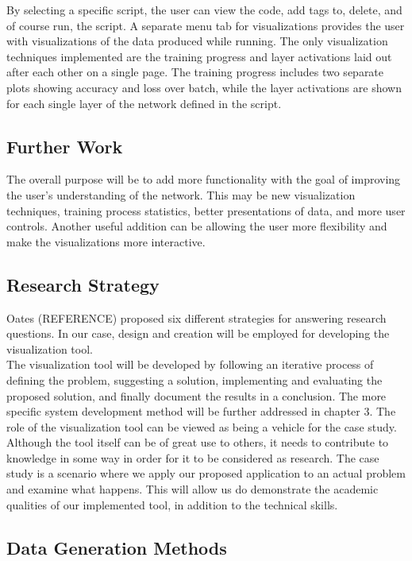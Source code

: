 \noindent By selecting a specific script, the user can view the code, add tags to, delete, and of course run, the script. A separate menu tab for visualizations provides the user with visualizations of the data produced while running. The only visualization techniques implemented are the training progress and layer activations laid out after each other on a single page. The training progress includes two separate plots showing accuracy and loss over batch, while the layer activations are shown for each single layer of the network defined in the script.

\subsection{Further Work}

The overall purpose will be to add more functionality with the goal of improving the user's understanding of the network. This may be new visualization techniques, training process statistics, better presentations of data, and more user controls. Another useful addition can be allowing the user more flexibility and make the visualizations more interactive.

\subsection{Research Strategy}

\noindent Oates (REFERENCE) proposed six different strategies for answering research questions. In our case, design and creation will be employed for developing the visualization tool. \\

\noindent The visualization tool will be developed by following an iterative process of defining the problem, suggesting a solution, implementing and evaluating the proposed solution, and finally document the results in a conclusion. The more specific system development method will be further addressed in chapter 3. The role of the visualization tool can be viewed as being a vehicle for the case study. Although the tool itself can be of great use to others, it needs to contribute to knowledge in some way in order for it to be considered as research. The case study is a scenario where we apply our proposed application to an actual problem and examine what happens. This will allow us do demonstrate the academic qualities of our implemented tool, in addition to the technical skills.

\subsection{Data Generation Methods}

